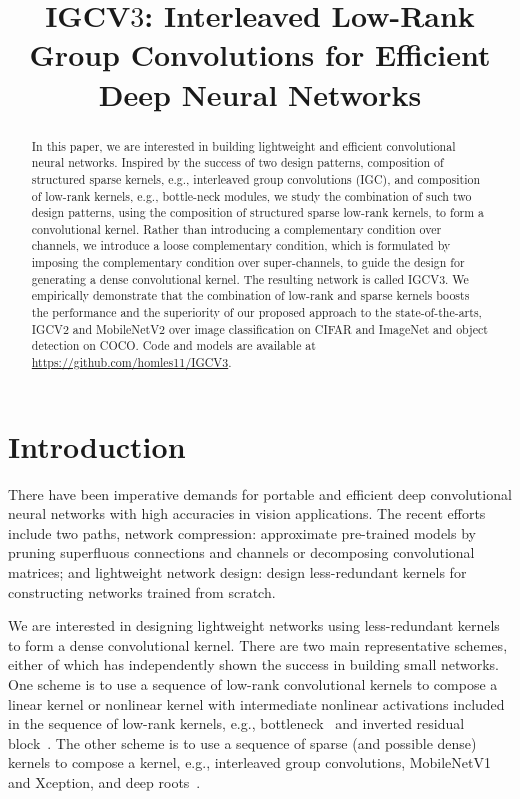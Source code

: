\documentclass{bmvc2k}
\title{IGCV$3$: Interleaved Low-Rank Group Convolutions
	for Efficient Deep Neural Networks}
\begin{document}
	\maketitle

	\begin{abstract}
		In this paper, we are interested in building lightweight and
		efficient convolutional neural networks.
		Inspired by the success of two design patterns,
		composition of structured sparse kernels, e.g., interleaved group convolutions (IGC),
		and composition of low-rank kernels, e.g., bottle-neck modules,
		we study the combination of such two design patterns, using the composition of structured sparse low-rank kernels,
		to form a convolutional kernel.
		Rather than introducing a complementary condition over channels,
		we introduce a loose complementary condition,
		which is formulated by imposing the complementary condition
		over super-channels,
		to guide the design for
		generating a dense convolutional kernel.
		The resulting network is called IGCV$3$.
		We empirically demonstrate that the combination of low-rank and sparse kernels boosts the performance
		and the superiority of our proposed approach
		to the state-of-the-arts, IGCV$2$ and MobileNetV$2$
		over image classification on CIFAR and ImageNet
		and object detection on COCO. Code and models are available at \url{https://github.com/homles11/IGCV3}.
	\end{abstract}

	\section{Introduction}
	\label{sec:intro}

	There have been imperative demands for portable and efficient deep convolutional neural networks
	with high accuracies in vision applications.
	The recent efforts include two paths,
	network compression:
	approximate pre-trained models
	by pruning superfluous connections and channels
	or decomposing convolutional matrices;
	and lightweight network design:
	design less-redundant kernels for constructing networks
	trained from scratch.

	We are interested
	in designing lightweight networks
	using less-redundant kernels to form a dense convolutional kernel.
	There are two main representative schemes,
	either of which has independently shown the success in building small networks.
	One scheme is to use a sequence of low-rank convolutional kernels to compose a linear kernel
	or nonlinear kernel with intermediate nonlinear activations included in the sequence of low-rank kernels,
	e.g., bottleneck~\cite{he2016deep} and inverted residual block~\cite{sandler2018inverted}.
	The other scheme is to use a sequence of sparse (and possible dense) kernels
	to compose a kernel,
	e.g., interleaved group convolutions,
	MobileNetV1 and Xception,
	and deep roots~\cite{zhang2017interleaved,howard2017mobilenets,Chollet16a,IoannouRCC16}.
\end{document}
